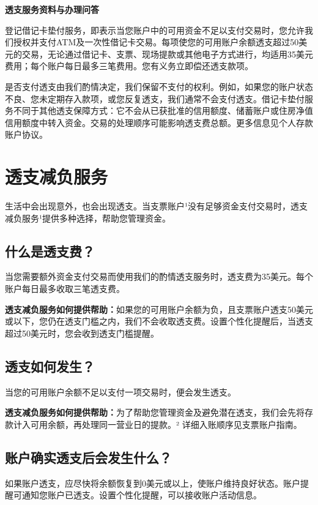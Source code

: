 \documentclass[UTF8,fontset=none,11pt,a4paper]{ctexart}
\begin{document}
{\noindent\fontsize{20}{25}\selectfont\bfseries 透支服务资料与办理问答\par}
\vspace{10pt}
登记借记卡垫付服务，即表示当您账户中的可用资金不足以支付交易时，您允许我们授权并支付ATM及一次性借记卡交易。每项使您的可用账户余额透支超过50美元的交易，无论通过借记卡、支票、现场提款或其他电子方式进行，均适用35美元费用；每个账户每日最多三笔费用。您有义务立即偿还透支款项。


是否支付透支由我们酌情决定，我们保留不支付的权利。例如，如果您的账户状态不良、您未定期存入款项，或您反复透支，我们通常不会支付透支。借记卡垫付服务不同于其他透支保障方式：它不会从已获批准的信用额度、储蓄账户或住房净值信用额度中转入资金。交易的处理顺序可能影响透支费总额。更多信息见个人存款账户协议。


\section*{透支减负服务}
生活中会出现意外，也会出现透支。当支票账户¹没有足够资金支付交易时，透支减负服务¹提供多种选择，帮助您管理资金。


\subsection*{什么是透支费？}
当您需要额外资金支付交易而使用我们的酌情透支服务时，透支费为35美元。每个账户每日最多收取三笔透支费。


\textbf{透支减负服务如何提供帮助：}如果您的可用账户余额为负，且支票账户透支50美元或以下，您仍在透支门槛之内，我们不会收取透支费。设置个性化提醒后，当透支超过50美元时，您会收到透支门槛提醒。


\subsection*{透支如何发生？}
当您的可用账户余额不足以支付一项交易时，便会发生透支。


\textbf{透支减负服务如何提供帮助：}为了帮助您管理资金及避免潜在透支，我们会先将存款计入可用余额，再处理同一营业日的提款。² 详细入账顺序见支票账户指南。


\subsection*{账户确实透支后会发生什么？}
如果账户透支，应尽快将余额恢复到0美元或以上，使账户维持良好状态。账户提醒可通知您账户已透支。设置个性化提醒，可以接收账户活动信息。
\end{document}
